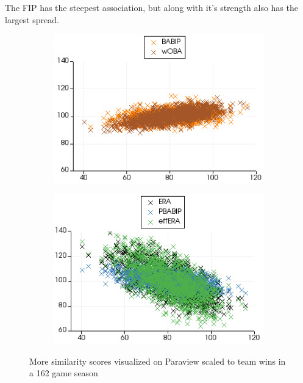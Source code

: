 \documentclass[12pt]{article}
\numberwithin{equation}{subsection}
\begin{document}
\noindent The FIP has the steepest association, but along with it's strength also has the largest spread.

\begin{figure}[H] 
  \begin{subfigure}[b]{0.5\linewidth}
    \centering
    \includegraphics[width=0.9\linewidth]{wins6} 
    \captionsetup{justification=centering}
    \label{fig2:a} 
    \vspace{4ex}
  \end{subfigure}%
  \begin{subfigure}[b]{0.5\linewidth}
    \centering
    \includegraphics[width=0.9\linewidth]{wins7} 
    \captionsetup{justification=centering}
    \label{fig2:b} 
    \vspace{4ex}
  \end{subfigure}
  \centering
  \caption{More similarity scores visualized on Paraview scaled to team wins in a 162 game season}
\end{figure}
\end{document}
